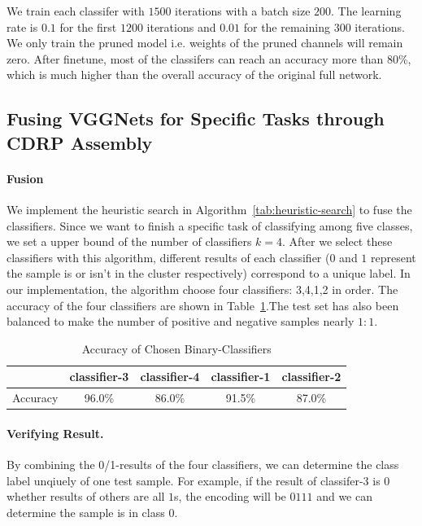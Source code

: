 \documentclass[sigplan,10pt,review]{acmart}\settopmatter{printfolios=true,printccs=false,printacmref=false}
\begin{document}
We train each classifer with $1500$ iterations with a batch size $200$. 
The learning rate is $0.1$ for the first $1200$ iterations and $0.01$ for the remaining $300$ iterations. 
We only train the pruned model i.e. weights of the pruned channels will remain zero.
After finetune, most of the classifers can reach an accuracy more than 80\%, which is much higher than the overall accuracy of the original full network.
 

 
\subsection{Fusing VGGNets for Specific Tasks through CDRP Assembly}
\paragraph{Fusion} We implement the heuristic search in Algorithm~\ref{tab:heuristic-search} to fuse the classifiers. 
Since we want to finish a specific task of classifying among five classes, we set a upper bound of the number of classifiers $k=4$. 
After we select these classifiers with this algorithm, different results of each classifier ($0$ and $1$ represent the sample is or isn't in the cluster respectively) correspond to a unique label.
In our implementation, the algorithm choose four classifiers: 3,4,1,2 in order. 
The accuracy of the four classifiers are shown in Table~\ref{tab:classifer-accuracy}.The test set has also been balanced to make the number of positive and negative samples nearly $1:1$. 

\begin{table}[!htp]
	\begin{tabular}{|c|c|c|c|c|}
	\hline
	& classifier-3 & classifier-4 & classifier-1 & classifier-2 \\
	\hline
	Accuracy & 96.0\% & 86.0\% & 91.5\% & 87.0\%\\
	\hline
	\end{tabular}
    \caption{Accuracy of Chosen Binary-Classifiers}
    \label{tab:classifer-accuracy}
\end{table}

\paragraph{Verifying Result.}By combining the 0/1-results of the four classifiers, we can determine the class label unqiuely of one test sample.
For example, if the result of classifer-3 is $0$ whether results of others are all $1$s, the encoding will be $0111$ and we can determine the sample is in class $0$. 
\end{document}
